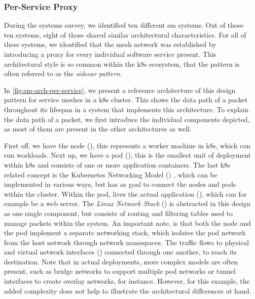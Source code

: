 \subsubsection{Per-Service Proxy}
\label{sec:survey:analysis:architectures:per-service}

During the systems survey, we identified ten different \gls{sm} systems. Out of those ten systems, eight of those shared similar architectural characteristics. For all of these systems, we identified that the mesh network was established by introducing a proxy for every individual software service present. This architectural style is so common within the \gls{k8s} ecosystem, that the pattern is often referred to as the \textit{sidecar pattern}.


In \cref{fig:sm-arch-per-service}, we present a reference architecture of this design pattern for service meshes in a \gls{k8s} cluster. This shows the data path of a packet throughout its lifespan in a system that implements this architecture. To explain the data path of a packet, we first introduce the individual components depicted, as most of them are present in the other architectures as well. 

    


First off, we have the node (), this represents a worker machine in \gls{k8s}, which can run workloads. Next up, we have a \gls{pod} (), this is the smallest unit of deployment within \gls{k8s} and consists of one or more application containers. The last \gls{k8s} related concept is the Kubernetes Networking Model () \cite{kubernetes-cluster-networking}, which can be implemented in various ways, but has as goal to connect the nodes and pods within the cluster. Within the \gls{pod}, lives the actual application (), which can for example be a web server. The \textit{Linux Network Stack} () is abstracted in this design as one single component, but consists of routing and filtering tables used to manage packets within the system. An important note, is that both the node and the \gls{pod} implement a separate networking stack, which isolates the pod network from the host network through network namespaces. The traffic flows to physical and virtual network interfaces () connected through one another, to reach its destination. Note that in actual deployments, more complex models are often present, such as bridge networks to support multiple pod networks or tunnel interfaces to create overlay networks, for instance. However, for this example, the added complexity does not help to illustrate the architectural differences at hand.


